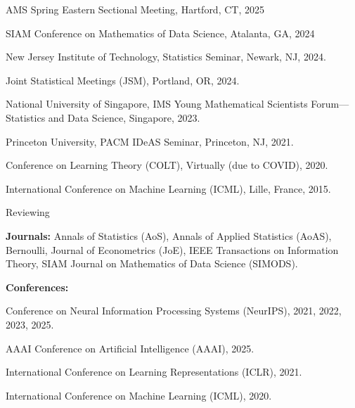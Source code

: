 \documentclass{article}
\begin{document}
\vspace{2mm}
AMS Spring Eastern Sectional Meeting, Hartford, CT, 2025

\vspace{2mm}
SIAM Conference on Mathematics of Data Science, Atalanta, GA, 2024


\vspace{2mm}
New Jersey Institute of Technology, Statistics Seminar, Newark, NJ, 2024.

\vspace{2mm}
Joint Statistical Meetings (JSM), Portland, OR, 2024.

\vspace{2mm}
National University of Singapore, IMS Young Mathematical Scientists Forum---Statistics and Data Science, Singapore, 2023.

\vspace{2mm}
Princeton University, PACM IDeAS Seminar, Princeton, NJ, 2021.

\vspace{2mm}
Conference on Learning Theory (COLT), Virtually (due to COVID), 2020.

\vspace{2mm}
International Conference on Machine Learning (ICML), Lille, France, 2015.



\vspace{2mm}

\begin{large}
\noindent Reviewing
\end{large}

\vspace{2mm}
\textbf{Journals:} Annals of Statistics (AoS), Annals of Applied Statistics (AoAS), Bernoulli, Journal of Econometrics (JoE), IEEE Transactions on Information Theory, SIAM Journal on Mathematics of Data Science (SIMODS).


\vspace{2mm}
\textbf{Conferences:} 


\vspace{2mm}
\quad\quad  Conference on Neural Information Processing Systems (NeurIPS), 2021, 2022, 2023, 2025.

\vspace{2mm}
\quad\quad AAAI Conference on Artificial Intelligence (AAAI), 2025.

\vspace{2mm}
\quad\quad International Conference on Learning Representations (ICLR), 2021.

\vspace{2mm}
\quad\quad International Conference on Machine Learning (ICML), 2020.
\end{document}
